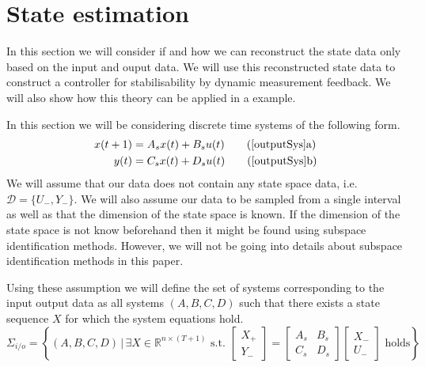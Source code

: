 \section{State estimation}
In this section we will consider if and how we can reconstruct the state data only based on the input and ouput data. We will use this reconstructed state data to construct a controller for stabilisability by dynamic measurement feedback. We will also show how this theory can be applied in a example.



In this section we will be considering discrete time systems of the following form.
\begin{subequations}
	\begin{align} 
	x(t+1) &= A_s x(t) + B_s u(t) \tag{\ref{outputSys}a} \\
	y(t)   &= C_s x(t) + D_s u(t) \tag{\ref{outputSys}b}
	\end{align}
\end{subequations}
We will assume that our data does not contain any state space data, i.e. $\mathcal{D} = \{ U_-,Y_- \}$. We will also assume our data to be sampled from a single interval as well as that the dimension of the state space is known. If the dimension of the state space is not know beforehand then it might be found using subspace identification methods. However, we will not be going into details about subspace identification methods in this paper.

Using these assumption we will define the set of systems corresponding to the input output data as all systems $(A,B,C,D)$ such that there exists a state sequence $X$ for which the system equations hold. %
\begin{equation*}
	\Sigma_{i/o} = \left\{ (A,B,C,D) \, | \, \exists X \in \mathbb{R}^{n \times (T+1)} \mbox{ s.t. } \begin{bmatrix} X_{+} \\ Y_{-} \end{bmatrix} = \begin{bmatrix} A_s & B_s \\ C_s & D_s \end{bmatrix} \begin{bmatrix} X_{-} \\ U_{-} \end{bmatrix} \mbox{ holds} \right\}
\end{equation*}

